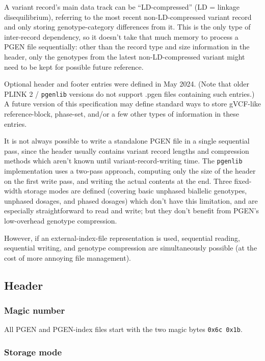 \documentclass[8pt]{article}
\begin{document}
A variant record's main data track can be ``LD-compressed'' (LD = linkage
disequilibrium), referring to the most recent non-LD-compressed variant record
and only storing genotype-category differences from it.  This is the only type
of inter-record dependency, so it doesn't take that much memory to process a
PGEN file sequentially: other than the record type and size information in the
header, only the genotypes from the latest non-LD-compressed variant might need
to be kept for possible future reference.

Optional header and footer entries were defined in May 2024.  (Note that older
PLINK 2 / \texttt{pgenlib} versions do not support .pgen files containing
such entries.)  A future version of this specification may define standard ways
to store gVCF-like reference-block, phase-set, and/or a few other types of
information in these entries.

It is not always possible to write a standalone PGEN file in a single
sequential pass, since the header usually contains variant record lengths and
compression methods which aren't known until variant-record-writing time.  The
\texttt{pgenlib} implementation uses a two-pass approach, computing only the
size of the header on the first write pass, and writing the actual contents at
the end.  Three fixed-width storage modes are defined (covering basic unphased
biallelic genotypes, unphased dosages, and phased dosages) which don't have
this limitation, and are especially straightforward to read and write; but they
don't benefit from PGEN's low-overhead genotype compression.

However, if an external-index-file representation is used, sequential reading,
sequential writing, and genotype compression are simultaneously possible (at
the cost of more annoying file management).

\subsection{Header}

\subsubsection{Magic number}

All PGEN and PGEN-index files start with the two magic bytes \texttt{0x6c
  0x1b}.

\subsubsection{Storage mode}
\end{document}
